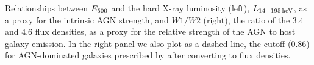 \label{fig:excess_vs_agn} Relationships between $E_{\rm 500}$ and the hard X-ray luminosity (left), $L_{\rm 14-195\,keV}$, as a proxy for the intrinsic AGN strength, and $W1/W2$ (right), the ratio of the 3.4 and 4.6 \um{} flux densities, as a proxy for the relative strength of the AGN to host galaxy emission. In the right panel we also plot as a dashed line, the cutoff (0.86) for AGN-dominated galaxies prescribed by \citet{Stern:2012mz} after converting to flux densities.
  
  